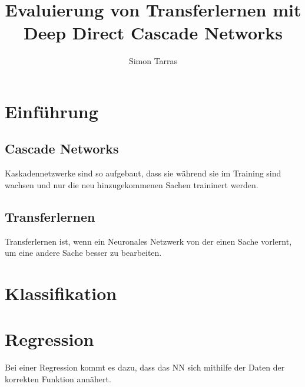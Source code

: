 \documentclass[ngerman]{report}
\title{Evaluierung von Transferlernen mit Deep Direct Cascade Networks}
\author{Simon Tarras}
\begin{document}
    \maketitle
    \chapter{Einführung}
        \section{Cascade Networks}
        Kaskadennetzwerke sind so aufgebaut, dass sie während sie 
        im Training sind wachsen und nur die neu hinzugekommenen 
        Sachen traininert werden.
        \section{Transferlernen}
        Transferlernen ist, wenn ein Neuronales Netzwerk von der 
        einen Sache vorlernt, um eine andere Sache besser zu 
        bearbeiten.
    \chapter{Klassifikation}
    
    
    \chapter{Regression}
    Bei einer Regression kommt es dazu, dass das NN sich mithilfe 
    der Daten der korrekten Funktion annähert.
\end{document}
